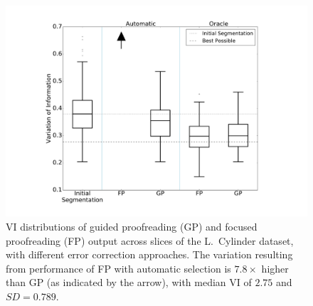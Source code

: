\begin{figure}[t]
\centering
\includegraphics[width=\linewidth]{gfx/cylboxplot.pdf}
\caption{VI distributions of guided proofreading (GP) and focused proofreading (FP) output across slices of the L.~Cylinder dataset, with different error correction approaches. The variation resulting from performance of FP with automatic selection is $7.8\times$ higher than GP (as indicated by the arrow), with median VI of $2.75$ and $SD=0.789$.}
\label{fig:cylboxplot}
\end{figure}


    
    